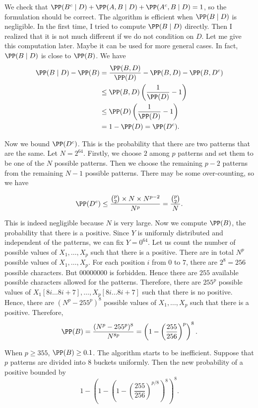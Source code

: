 We check that $\PP(B^c\mid D)+\PP(A,B\mid D)+\PP(A^c,B\mid D)=1$, so the formulation should be correct. The algorithm is efficient when $\PP(B\mid D)$ is negligible. In the first time, I tried to compute $\PP(B\mid D)$ directly. Then I realized that it is not much different if we do not condition on $D$. Let me give this computation later. Maybe it can be used for more general cases. In fact, $\PP(B\mid D)$ is close to $\PP(B)$. We have
\begin{align*}
  \PP(B\mid D) - \PP(B)
   & = \dfrac{\PP(B,D)}{\PP(D)} - \PP(B,D) - \PP(B,D^c) \\
   & \le \PP(B,D)\left(\dfrac{1}{\PP(D)}-1\right)       \\
   & \le \PP(D)\left(\dfrac{1}{\PP(D)}-1\right)         \\
   & = 1-\PP(D) = \PP(D^c).
\end{align*}

Now we bound $\PP(D^c)$. This is the probability that there are two patterns that are the same. Let $N=2^{64}$. Firstly, we choose $2$ among $p$ patterns and set them to be one of the $N$ possible patterns. Then we choose the remaining $p-2$ patterns from the remaining $N-1$ possible patterns. There may be some over-counting, so we have

$$\PP(D^c)\le \dfrac{\binom{p}{2}\times N\times N^{p-2}}{N^p} = \dfrac{\binom{p}{2}}{N}.$$

This is indeed negligible because $N$ is very large. Now we compute $\PP(B)$, the probability that there is a positive. Since $Y$ is uniformly distributed and independent of the patterns, we can fix $Y=0^{64}$. Let us count the number of possible values of $X_1,\ldots,X_p$ such that there is a positive. There are in total $N^p$ possible values of $X_1,\ldots,X_p$. For each position $i$ from $0$ to $7$, there are $2^8=256$ possible characters. But $00000000$ is forbidden. Hence there are $255$ available possible characters allowed for the patterns. Therefore, there are $255^p$ possible values of $X_1[8i\ldots 8i+7],\ldots,X_p[8i\ldots 8i+7]$ such that there is no positive. Hence, there are $(N^p-255^p)^8$ possible values of $X_1,\ldots,X_p$ such that there is a positive. Therefore,
$$\PP(B) = \dfrac{(N^p-255^p)^8}{N^{8p}} = \left(1-\left(\dfrac{255}{256}\right)^p\right)^8.$$

When $p\ge 355$, $\PP(B)\ge 0.1$. The algorithm starts to be inefficient. Suppose that $p$ patterns are divided into $8$ buckets uniformly. Then the new probability of a positive bounded by
$$1-\left(1-\left(1-\left(\dfrac{255}{256}\right)^{p/8}\right)^8\right)^8.$$

